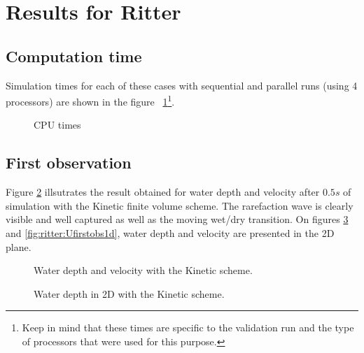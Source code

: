 \section{Results for Ritter}


\subsection{Computation time}

Simulation times for each of these cases with sequential and parallel runs (using 4 processors) are shown in the figure ~\ref{fig:ritter:cputime}\footnote{Keep in mind that these times
are specific to the validation run and the type of processors that were used for this purpose.}.

\begin{figure}[H]
  \centering
  \caption{CPU times}\label{fig:ritter:cputime}
\end{figure}

\subsection{First observation}

Figure \ref{fig:ritter:firstobs1d} illsutrates the result obtained for water depth and velocity after $0.5s$ of
simulation with the Kinetic finite volume scheme. The rarefaction wave is clearly visible and well
captured as well as the moving wet/dry transition.
On figures \ref{fig:ritter:Hfirstobs1d} and  \ref{fig:ritter:Ufirstobs1d}, water depth and velocity are presented in the 2D plane.

\begin{figure}[H]
\begin{minipage}[t]{0.5\textwidth}
 \centering
\end{minipage}%
\begin{minipage}[t]{0.5\textwidth}
 \centering
\end{minipage}
  \caption{Water depth and velocity with the Kinetic scheme.}
  \label{fig:ritter:firstobs1d}
\end{figure}

\begin{figure}[H]
 \centering
  \caption{Water depth in 2D with the Kinetic scheme.}
  \label{fig:ritter:Hfirstobs1d}
\end{figure}

